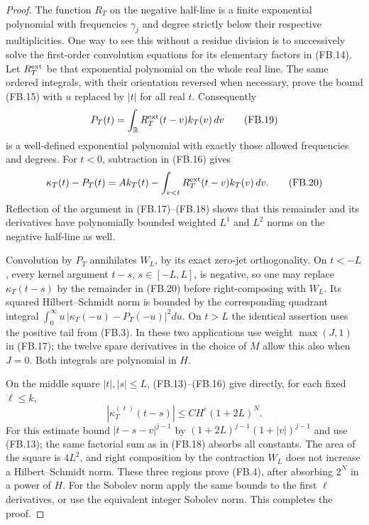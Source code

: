 \begin{proof}
The function $R_T$ on the negative half-line is a finite
exponential polynomial with frequencies $\gamma_j$ and
degree strictly below their respective multiplicities.
One way to see this without a residue division is to
successively solve the first-order convolution equations
for its elementary factors in (FB.14).
Let $R_T^{\rm ext}$ be that exponential polynomial on
the whole real line.
The same ordered integrals, with their orientation
reversed when necessary, prove the bound (FB.15) with
$u$ replaced by $|t|$ for all real $t$.
Consequently
\[
 P_T(t)=\int_{\mathbb R}R_T^{\rm ext}(t-v)k_T(v)\,dv
                                                               \tag{FB.19}
\]
is a well-defined exponential polynomial with exactly
those allowed frequencies and degrees.
For $t<0$, subtraction in (FB.16) gives
\[
 \kappa_T(t)-P_T(t)
       =A k_T(t)-\int_{v<t}R_T^{\rm ext}(t-v)k_T(v)\,dv.
                                                               \tag{FB.20}
\]
Reflection of the argument in (FB.17)--(FB.18) shows that
this remainder and its derivatives have polynomially
bounded weighted $L^1$ and $L^2$ norms on the negative
half-line as well.

Convolution by $P_T$ annihilates $W_L$, by its exact
zero-jet orthogonality.  On $t<-L$, every kernel argument
$t-s$, $s\in[-L,L]$, is negative, so one may replace
$\kappa_T(t-s)$ by the remainder in (FB.20) before
right-composing with $W_L$.
Its squared Hilbert--Schmidt norm is bounded by the corresponding
quadrant integral
$\int_0^\infty u\,|\kappa_T(-u)-P_T(-u)|^2du$.
On $t>L$ the identical assertion uses the positive
tail from (FB.3).  In these two applications use weight
$\max(J,1)$ in (FB.17); the twelve spare derivatives in
the choice of $M$ allow this also when $J=0$.
Both integrals are polynomial in $H$.

On the middle square $|t|,|s|\leq L$, (FB.13)--(FB.16)
give directly, for each fixed $\ell\leq k$,
\[
 |\kappa_T^{(\ell)}(t-s)|
                     \leq C H^c(1+2L)^N.
                                                               \tag{FB.21}
\]
For this estimate bound $|t-s-v|^{j-1}$ by
$(1+2L)^{j-1}(1+|v|)^{j-1}$ and use (FB.13);
the same factorial sum as in (FB.18) absorbs all constants.
The area of the square is $4L^2$, and right composition
by the contraction $W_L$ does not increase a
Hilbert--Schmidt norm.
These three regions prove (FB.4), after absorbing
$2^N$ in a power of $H$.
For the Sobolev norm apply the same bounds to the first
$\ell$ derivatives, or use the equivalent integer
Sobolev norm.  This completes the proof.
\end{proof}

